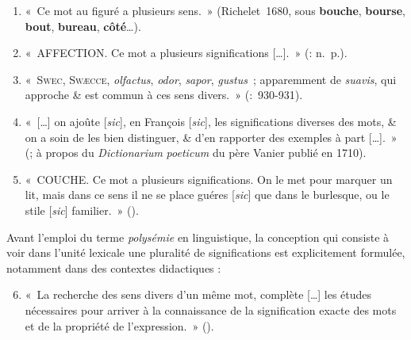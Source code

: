 \documentclass[output=paper]{langsci/langscibook}
\begin{document}
\begin{enumerate}
\renewcommand{\labelenumi}{$(\theenumi)$}
\item «~Ce mot au figuré a plusieurs sens.~» (Richelet~1680, sous \textbf{bouche}, \textbf{bourse}, \textbf{bout}, \textbf{bureau}, \textbf{côté}…).

\item «~AFFECTION. Ce mot a plusieurs significations […].~» (\citealt{regis_cours_1691}: n.~p.).

\item  «~S\textsc{wec,} \textsc{Swæcce,} \textit{olfactus}, \textit{odor}, \textit{sapor}, \textit{gustus~}; apparemment de \textit{suavis}, qui approche \& est commun à ces sens divers.~» (\citealt[930-931]{thomassin_methode_1690}:~930-931).

\item «~[…] on ajoûte [\textit{sic}], en François [\textit{sic}], les significations diverses des mots, \& on a soin de les bien distinguer, \& d’en rapporter des exemples à part […].~» (\citealt[172]{leclerc_bibliotheque_1715}; à propos du \textit{Dictionarium} \textit{poeticum} du père Vanier publié en 1710).

\item «~COUCHE. Ce mot a plusieurs significations. On le met pour marquer un lit, mais dans ce sens il ne se place guéres [\textit{sic}] que dans le burlesque, ou le stile [\textit{sic}] familier.~» (\citealt[167]{le_roux_dictionaire_1735}).

\end{enumerate}

Avant l’emploi du terme \textit{polysémie} en linguistique, la conception qui consiste à voir dans l’unité lexicale une pluralité de significations est explicitement formulée, notamment dans des contextes didactiques :

\begin{enumerate}\setcounter{enumi}{5}
\renewcommand{\labelenumi}{$(\theenumi)$}

\item «~La recherche des sens divers d’un même mot, complète […] les études nécessaires pour arriver à la connaissance de la signification exacte des mots et de la propriété de l’expression.~» (\citealt[252]{michel_etudes_1858}).

\end{enumerate}
\end{document}

